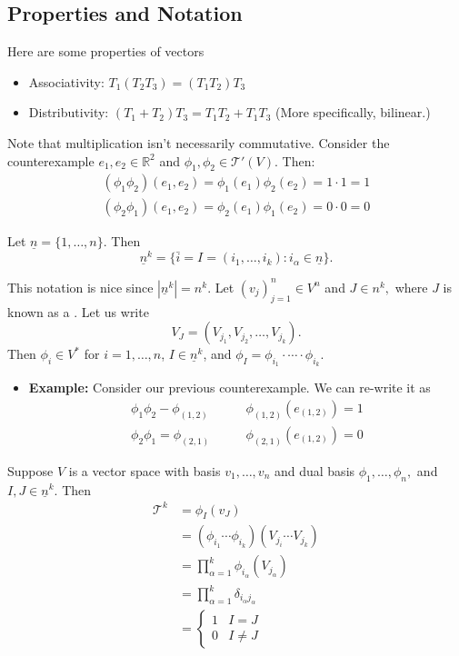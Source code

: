 \documentclass{article}
\numberwithin{equation}{section}
\begin{document}
\subsection{Properties and Notation}
Here are some properties of vectors
\begin{itemize}
    \item Associativity: $T_1(T_2T_3)=(T_1T_2)T_3$
    \item Distributivity: $(T_1+T_2)T_3 = T_1T_2+T_1T_3$ (More specifically, bilinear.)
\end{itemize}
Note that multiplication isn't necessarily commutative. Consider the counterexample $e_1,e_2 \in \mathbb{R}^2$ and $\phi_1,\phi_2\in \mathcal{T}'(V).$ Then:
\begin{align*}
    (\phi_1\phi_2)(e_1,e_2) = \phi_1(e_1)\phi_2(e_2) = 1 \cdot 1 = 1\\ 
    (\phi_2\phi_1)(e_1,e_2) = \phi_2(e_1)\phi_1(e_2) = 0 \cdot 0 = 0
\end{align*}
\begin{definition}
    Let $\underline{n} = \{1,\dots,n\}$. Then
    \begin{equation}
        \underline{n}^k = \{\bar{i} = I =(i_1,\dots,i_k):i_\alpha \in \underline{n}\}.
    \end{equation}
\end{definition}
This notation is nice since $|\underline{n}^k| = n^k$. Let $(v_j)^n_{j=1} \in V^n$ and $J \in n^k,$ where $J$ is known as a . Let us write
\begin{equation}
    V_J = (V_{j_1},V_{j_2},\dots,V_{j_k}).
\end{equation}
Then $\phi_i \in V^*$ for $i=1,\dots,n$, $I \in \underline{n}^k$, and $\phi_I = \phi_{i_1}\cdot \cdots \cdot \phi_{i_k}.$
\begin{itemize}
    \item \textbf{Example:} Consider our previous counterexample. We can re-write it as
    \begin{align*}
        \phi_1\phi_2 - \phi_{(1,2)} &\quad\quad \phi_{(1,2)}(e_{(1,2)}) = 1 \\ 
        \phi_2\phi_1 = \phi_{(2,1)} &\quad\quad \phi_{(2,1)}(e_{(1,2)}) = 0
    \end{align*}
\end{itemize}
Suppose $V$ is a vector space with basis $v_1,\dots,v_n$ and dual basis $\phi_1,\dots,\phi_n,$ and $I,J \in \underline{n}^k.$ Then
\begin{align}
    \mathcal{T}^k &= \phi_I(v_J) \\ 
    &= (\phi_{i_1}\cdots \phi_{i_k})(V_{j_i}\cdots V_{j_k}) \\
    &= \prod_{\alpha=1}^k \phi_{i_\alpha}(V_{j_\alpha}) \\ 
    &= \prod_{\alpha=1}^k \delta_{i_\alpha j_\alpha} \\ 
    &= \begin{cases}
        1 & I=J \\ 
        0 & I \neq J
    \end{cases}
\end{align}
\end{document}
